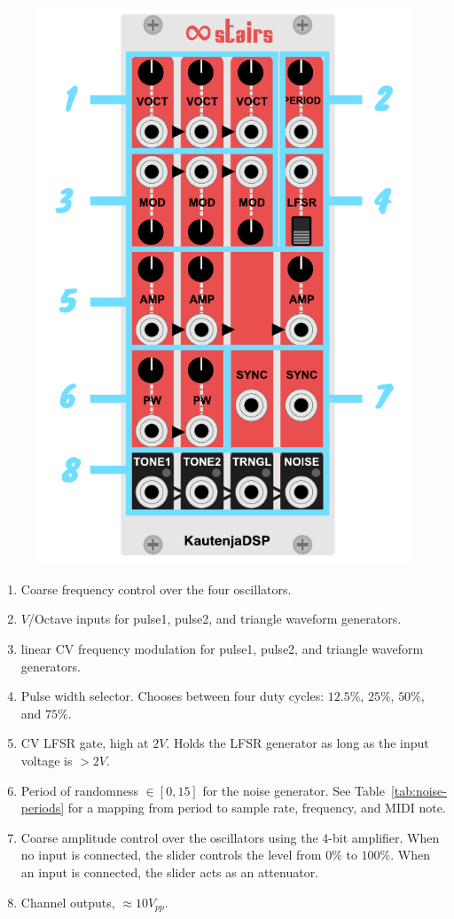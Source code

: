 \documentclass[12pt,letter]{article}
\begin{document}
\begin{figure}[!htp]
\centering
\includegraphics{Interface}
\end{figure}

\begin{enumerate}
  \item Coarse frequency control over the four oscillators.
  \item $V$/Octave inputs for pulse1, pulse2, and triangle waveform generators.
  \item linear CV frequency modulation for pulse1, pulse2, and triangle waveform generators.
  \item Pulse width selector. Chooses between four duty cycles: $12.5\%$, $25\%$, $50\%$, and $75\%$.
  \item CV LFSR gate, high at $2V$. Holds the LFSR generator as long as the input voltage is $>2V$.
  \item Period of randomness $\in [0, 15]$ for the noise generator. See Table~\ref{tab:noise-periods} for a mapping from period to sample rate, frequency, and MIDI note.
  \item Coarse amplitude control over the oscillators using the 4-bit amplifier. When no input is connected, the slider controls the level from $0\%$ to $100\%$. When an input is connected, the slider acts as an attenuator.
  \item Channel outputs, ${\approx}10V_{pp}$.
\end{enumerate}
\end{document}
